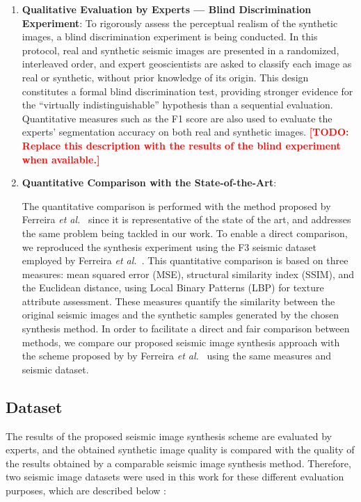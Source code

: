 \documentclass{ieeeaccess}
\begin{document}
\begin{enumerate}
    \item \textbf{Qualitative Evaluation by Experts — Blind Discrimination Experiment}: To rigorously assess the perceptual realism of the synthetic images, a blind discrimination experiment is being conducted. In this protocol, real and synthetic seismic images are presented in a randomized, interleaved order, and expert geoscientists are asked to classify each image as real or synthetic, without prior knowledge of its origin. This design constitutes a formal blind discrimination test, providing stronger evidence for the ``virtually indistinguishable'' hypothesis than a sequential evaluation. Quantitative measures such as the F1 score are also used to evaluate the experts' segmentation accuracy on both real and synthetic images.  \textcolor{red}{\textbf{[TODO: Replace this description with the results of the blind experiment when available.]}} 
    
    \item \textbf{Quantitative Comparison with the State-of-the-Art}:
    
    The quantitative comparison is performed with the method proposed by Ferreira \emph{et al.}~\cite{Ferreira2020} since it is representative of the state of the art, and addresses the same problem being tackled in our work. To enable a direct comparison, we reproduced the synthesis experiment using the F3 seismic dataset employed by Ferreira \emph{et al.}~\cite{Ferreira2020}. This quantitative comparison is based on three measures: mean squared error (MSE), structural similarity index (SSIM), and the Euclidean distance, using Local Binary Patterns (LBP) for texture attribute assessment. These measures quantify the similarity between the original seismic images and the synthetic samples generated by the chosen synthesis method. In order to facilitate a direct and fair comparison between methods, we compare our proposed  seismic image synthesis approach with the scheme proposed by by Ferreira \emph{et al.}~\cite{Ferreira2020} using the same measures and seismic dataset.
\end{enumerate}


\subsection{Dataset}

The results of the proposed seismic image synthesis scheme are evaluated by experts, and the obtained synthetic image quality is compared with the quality of the results obtained by a comparable seismic image synthesis method. Therefore, two seismic image datasets were used in this work for these different evaluation purposes, which are described below :
\end{document}
